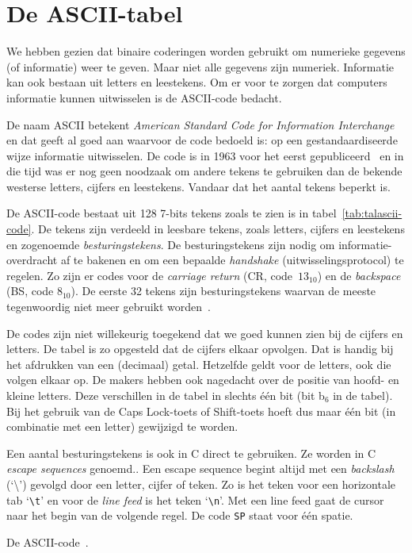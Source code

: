 \chapter{De ASCII-tabel}
\label{cha:asciitabel}
\thispagestyle{empty}

We hebben gezien dat binaire coderingen worden gebruikt om
numerieke gegevens (of informatie) weer te geven. Maar niet alle gegevens zijn numeriek.
Informatie kan ook bestaan uit letters en leestekens. Om er voor te zorgen dat
computers informatie kunnen uitwisselen is de ASCII-code bedacht.

De naam ASCII betekent \textsl{American Standard Code for Information Interchange} en
dat geeft al goed aan waarvoor de code bedoeld is: op een gestandaardiseerde wijze
informatie uitwisselen. De code is in 1963 voor het eerst gepubliceerd~\cite{asa1963ascii}
en in die tijd
was er nog geen noodzaak om andere tekens te gebruiken dan de bekende westerse letters,
cijfers en leestekens. Vandaar dat het aantal tekens beperkt is.

De ASCII-code bestaat uit 128 7-bits tekens zoals te zien is in
tabel~\ref{tab:talascii-code}. De tekens zijn verdeeld in leesbare tekens, zoals letters,
cijfers en leestekens en zogenoemde \textsl{besturingstekens}. De besturingstekens zijn nodig
om informatie-overdracht af te bakenen en om een bepaalde \textsl{handshake} 
(uitwisselingsprotocol) te regelen.
Zo zijn er codes voor de \textsl{carriage return} (CR, code~$13_{10}$) en de
\textsl{backspace} (BS, code $8_{10}$). De eerste 32 tekens zijn besturingstekens
waarvan de meeste tegenwoordig niet meer gebruikt worden~\cite{maini2007digital}.

De codes zijn niet willekeurig toegekend dat we goed kunnen zien bij de cijfers
en letters. De tabel is zo opgesteld dat de cijfers elkaar opvolgen. Dat is
handig bij het afdrukken van een (decimaal) getal.
Hetzelfde geldt voor de letters, ook die volgen elkaar op. De makers hebben ook nagedacht
over de positie van hoofd- en kleine letters. Deze verschillen in de tabel in slechts
\'{e}\'{e}n bit (bit b$_{6}$ in de tabel). Bij het gebruik van de Caps Lock-toets
of Shift-toets hoeft dus maar \'{e}\'{e}n bit (in combinatie met een letter) gewijzigd
te worden.

Een aantal besturingstekens is ook in C direct te gebruiken. Ze worden in C
\textsl{escape sequences} genoemd.. Een escape sequence
begint altijd met een \textsl{backslash} (`\textbackslash')
gevolgd door een letter, cijfer of teken. Zo is het teken voor een horizontale
tab `\texttt{\textbackslash t}' en voor de \textsl{line feed} is het teken
`\texttt{\textbackslash n}'. Met een line feed gaat de cursor naar het begin van
de volgende regel. De code \texttt{SP} staat voor één spatie.

\begin{table}[!p]
\caption{De ASCII-code~\cite{eijkhout2010ascii}.}
\label{tab:talascii-code}
\resizebox{\textwidth}{!}{}
\end{table}
